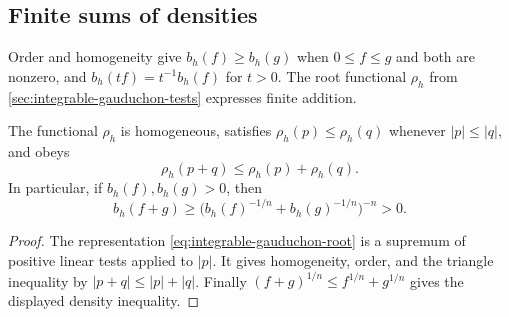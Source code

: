 \subsection{Finite sums of densities}

Order and homogeneity give $b_h(f)\geq b_h(g)$ when $0\leq f\leq g$ and both are nonzero, and $b_h(tf)=t^{-1}b_h(f)$ for $t>0$. The root functional $\rho_h$ from \cref{sec:integrable-gauduchon-tests} expresses finite addition.

\begin{proposition}\label{prop:individual-root-triangle}
The functional $\rho_h$ is homogeneous, satisfies
$\rho_h(p)\leq\rho_h(q)$ whenever $|p|\leq|q|$, and obeys
\[
 \rho_h(p+q)\leq\rho_h(p)+\rho_h(q).
\]
In particular, if $b_h(f),b_h(g)>0$, then
\[
 b_h(f+g)\geq
       \bigl(b_h(f)^{-1/n}+b_h(g)^{-1/n}\bigr)^{-n}>0.
\]
\end{proposition}
\begin{proof}
The representation \eqref{eq:integrable-gauduchon-root} is a supremum of positive linear tests applied to $|p|$. It gives homogeneity, order, and the triangle inequality by $|p+q|\leq|p|+|q|$. Finally
$(f+g)^{1/n}\leq f^{1/n}+g^{1/n}$ gives the displayed density inequality.

\end{proof}

